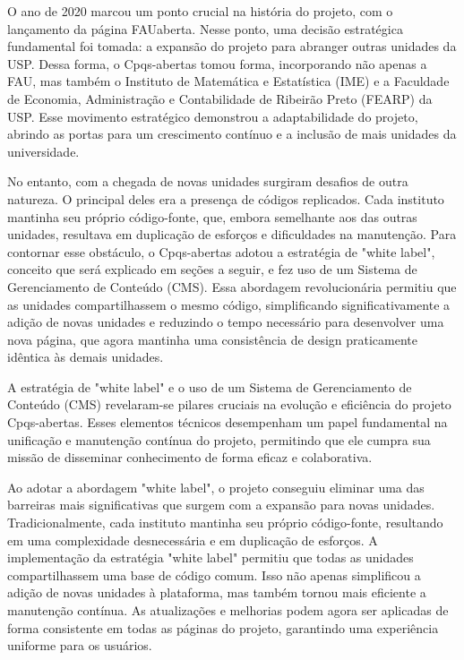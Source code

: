 \documentclass[12pt,twoside,english,brazilian]{article}
\begin{document}
O ano de 2020 marcou um ponto crucial na história do projeto, com o lançamento da página FAUaberta. Nesse ponto, uma decisão estratégica fundamental foi tomada: a expansão do projeto para abranger outras unidades da USP. Dessa forma, o Cpqs-abertas tomou forma, incorporando não apenas a FAU, mas também o Instituto de Matemática e Estatística (IME) e a Faculdade de Economia, Administração e Contabilidade de Ribeirão Preto (FEARP) da USP. Esse movimento estratégico demonstrou a adaptabilidade do projeto, abrindo as portas para um crescimento contínuo e a inclusão de mais unidades da universidade.

No entanto, com a chegada de novas unidades surgiram desafios de outra natureza. O principal deles era a presença de códigos replicados. Cada instituto mantinha seu próprio código-fonte, que, embora semelhante aos das outras unidades, resultava em duplicação de esforços e dificuldades na manutenção. Para contornar esse obstáculo, o Cpqs-abertas adotou a estratégia de "white label", conceito que será explicado em seções a seguir, e fez uso de um Sistema de Gerenciamento de Conteúdo (CMS). Essa abordagem revolucionária permitiu que as unidades compartilhassem o mesmo código, simplificando significativamente a adição de novas unidades e reduzindo o tempo necessário para desenvolver uma nova página, que agora mantinha uma consistência de design praticamente idêntica às demais unidades.

A estratégia de "white label" e o uso de um Sistema de Gerenciamento de Conteúdo (CMS) revelaram-se pilares cruciais na evolução e eficiência do projeto Cpqs-abertas. Esses elementos técnicos desempenham um papel fundamental na unificação e manutenção contínua do projeto, permitindo que ele cumpra sua missão de disseminar conhecimento de forma eficaz e colaborativa.

Ao adotar a abordagem "white label", o projeto conseguiu eliminar uma das barreiras mais significativas que surgem com a expansão para novas unidades. Tradicionalmente, cada instituto mantinha seu próprio código-fonte, resultando em uma complexidade desnecessária e em duplicação de esforços. A implementação da estratégia "white label" permitiu que todas as unidades compartilhassem uma base de código comum. Isso não apenas simplificou a adição de novas unidades à plataforma, mas também tornou mais eficiente a manutenção contínua. As atualizações e melhorias podem agora ser aplicadas de forma consistente em todas as páginas do projeto, garantindo uma experiência uniforme para os usuários.
\end{document}
